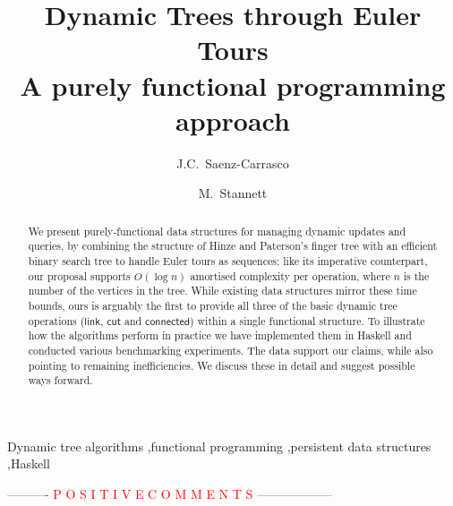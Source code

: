 \documentclass{elsarticle}
\newcommand{\MATHSF}[1]{\ensuremath{\mathsf{#1}}\xspace}
\newcommand{\link}{\MATHSF{link}}
\newcommand{\cut}{\MATHSF{cut}}
\newcommand{\connected}{\MATHSF{connected}}
\newcommand{\tcr} [1]{\textcolor{red}{#1}}
\begin{document}
\title{Dynamic Trees through Euler Tours\\%
\large{A purely functional programming approach}}

\author{J.C.~Saenz-Carrasco}

\author{M.~Stannett}

\address{Department of Computer Science,\\
Regent Court, 211 Portobello,\\
Sheffield S1 4DP, United Kingdom}


\begin{abstract}
We present purely-functional data structures for managing dynamic updates and queries, by combining the structure of Hinze and Paterson's finger tree with an efficient binary search tree to handle Euler tours as sequences: like its imperative counterpart, our proposal supports $O(\log n)$ amortised complexity per operation, where $n$ is the number of the vertices in the tree. While existing data structures mirror these time bounds, ours is arguably the first to provide all three of the basic dynamic tree operations (\link, \cut and \connected) within a single functional structure. To illustrate how the algorithms perform in practice we have implemented them in Haskell and conducted various benchmarking experiments. The data support our claims, while also pointing to remaining inefficiencies. We discuss these in detail and suggest possible ways forward.
\end{abstract}

\begin{keyword}
Dynamic tree algorithms \sep functional programming \sep persistent data structures \sep Haskell
\end{keyword}


\maketitle







\tcr{---------- P O S I T I V E    C O M M E N T S ------------------}
\end{document}
